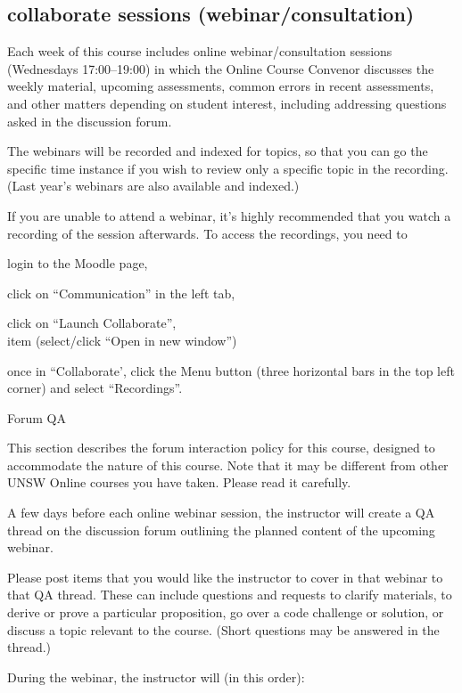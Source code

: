 \documentclass[11pt]{article}
\begin{document}
\subsection{collaborate sessions (webinar/consultation)}
Each week of this course includes online webinar/consultation sessions
(Wednesdays 17:00–19:00) in which the Online Course Convenor discusses the
weekly material, upcoming assessments, common errors in recent assessments,
and other matters depending on student interest, including addressing questions
asked in the discussion forum.

The webinars will be recorded and indexed for topics, so that you can go the
specific time instance if you wish to review only a specific topic in the
recording. (Last year's webinars are also available and indexed.)

If you are unable to attend a webinar, it's highly recommended that you watch a
recording of the session afterwards.
To access the recordings, you need to
\begin{description}
    \item login to the Moodle page,
    \item click on ``Communication'' in the left tab,
    \item click on ``Launch Collaborate'',
    \\item (select/click ``Open in new window'')
    \item once in ``Collaborate', click the Menu button (three horizontal bars in the top left corner) and select ``Recordings''.
\end{description}

Forum QA

This section describes the forum interaction policy for this course, designed to accommodate the nature of this course. Note that it may be different from other UNSW Online courses you have taken. Please read it carefully.

    A few days before each online webinar session, the instructor will create a QA thread on the discussion forum outlining the planned content of the upcoming webinar.

    Please post items that you would like the instructor to cover in that webinar to that QA thread. These can include questions and requests to clarify materials, to derive or prove a particular proposition, go over a code challenge or solution, or discuss a topic relevant to the course.  (Short questions may be answered in the thread.)

    During the webinar, the instructor will (in this order):
\end{document}
